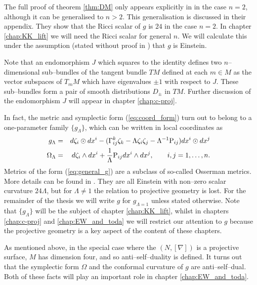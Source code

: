\begin{rmk}
The full proof of theorem \ref{thm:DM} only appears explicitly in \cite{DM} in the case $n=2$, although it can be generalised to $n>2$. This generalisation is discussed in their appendix. They show that the Ricci scalar of $g$ is $24$ in the case $n=2$. In chapter \ref{chap:KK_lift} we will need the Ricci scalar for general $n$. We will calculate this under the assumption (stated without proof in \cite{DM}) that $g$ is Einstein.
\end{rmk}

\begin{rmk}
Note that an endomorphism $J$ which squares to the identity defines two $n$--dimensional sub--bundles of the tangent bundle $TM$ defined at each $m\in M$ as the vector subspaces of $T_mM$ which have eigenvalues $\pm 1$ with respect to $J$. These sub--bundles form a pair of smooth distributions $D_\pm$ in $TM$. Further discussion of the endomorphism $J$ will appear in chapter \ref{chap:c-proj}.
\end{rmk}

\begin{rmk}
In fact, the metric and symplectic form (\ref{eq:coord_form}) turn
out to belong to a one-parameter family $\{g_{\Lambda}\}$, which
can be written in local coordinates as 
\begin{eqnarray}
g_{\Lambda} & = &  d\zeta_{i}\odot dx^{i}-(\Gamma_{ij}^{k}\zeta_{k}-\Lambda \zeta_{i}\zeta_{j}-\Lambda^{-1}\mathrm{P}_{ij}) dx^{i}\odot dx^{j}\label{eq:general_g}\\
\Omega_{\Lambda} & = &  d\zeta_{i}\wedge dx^{i}+\frac{1}{\Lambda}\mathrm{P}_{ij} dx^{i}\wedge dx^{j},\qquad i,j=1,\dots ,n.\label{eq:general_omega}
\end{eqnarray}
Metrics of the form (\ref{eq:general_g}) are a subclass of so-called
Osserman metrics. More details can be found in \cite{No-louzao1991}.
They are all Einstein with non--zero scalar curvature $24\Lambda$, but for $\Lambda\neq1$ the relation to projective geometry is lost. For the remainder of the thesis we will write $g$ for $g_{\Lambda=1}$ unless stated otherwise. Note that $\{g_\Lambda\}$ will be the subject of chapter \ref{chap:KK_lift}, whilst in chapters \ref{chap:c-proj} and \ref{chap:EW_and_toda} we will restrict our attention to $g$ because the projective geometry is a key aspect of the content of these chapters.
\end{rmk}

\begin{rmk}
As mentioned above, in the special case where the $(N,[\nabla])$ is a projective surface, $M$ has dimension four, and so anti--self--duality is defined. It turns out that the symplectic form $\Omega$ and the conformal curvature of $g$ are anti--self--dual. Both of these facts will play an important role in chapter \ref{chap:EW_and_toda}.
\end{rmk}

